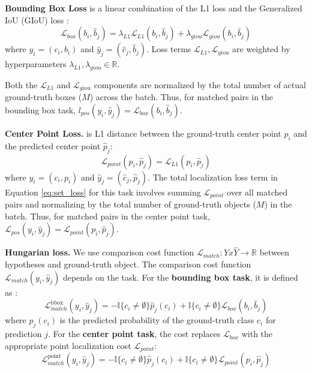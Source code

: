 \textbf{Bounding Box Loss} is a linear combination of the L1 loss and the Generalized IoU (GIoU) loss \cite{rezatofighiGeneralizedIntersectionUnion2019}:
\begin{equation}
    \mathcal{L}_{box}(b_i, \hat{b}_j) = \lambda_{L1} \mathcal{L}_{L1}(b_i, \hat{b}_j) + \lambda_{giou} \mathcal{L}_{giou}(b_i, \hat{b}_j)
    \label{eq:box_loss_revised}
\end{equation}
where $y_i = (c_i, b_i)$ and $\hat{y}_j = (\hat{c}_j, \hat{b}_j)$. Loss terms $ \mathcal{L}_{L1}, \mathcal{L}_{giou} $ are weighted by hyperparameters $ \lambda_{L1}, \lambda_{giou} \in \mathbb{R} $.

Both the $ \mathcal{L}_{L1} $ and $ \mathcal{L}_{giou} $ components are normalized by the total number of actual ground-truth boxes ($M$) across the batch. Thus, for matched pairs in the bounding box task, $l_{pos}(y_i, \hat{y}_j) = \mathcal{L}_{box}(b_i, \hat{b}_j)$.

\textbf{Center Point Loss.} is L1 distance between the ground-truth center point $p_i$ and the predicted center point $\hat{p}_j$:
\begin{equation} \label{eq:point_loss}
    \mathcal{L}_{point}(p_i, \hat{p}_j) = \mathcal{L}_{L1}(p_i, \hat{p}_j)
\end{equation}
where $y_i = (c_i, p_i)$ and $\hat{y}_j = (\hat{c}_j, \hat{p}_j)$. The total localization loss term in Equation \ref{eq:set_loss} for this task involves summing $\mathcal{L}_{point}$ over all matched pairs and normalizing by the total number of ground-truth objects ($M$) in the batch. Thus, for matched pairs in the center point task, $\mathcal{L}_{pos}(y_i, \hat{y}_j) = \mathcal{L}_{point}(p_i, \hat{p}_j)$.

\textbf{Hungarian loss.} We use comparison cost function $\mathcal{L}_{match}: Y x \hat{Y} \rightarrow \mathbb{R}$ between hypotheses and ground-truth object. The comparison cost function $\mathcal{L}_{match}(y_i, \hat{y}_j)$ depends on the task. For the \textbf{bounding box task}, it is defined as \cite{carionEndtoEndObjectDetection2020}:
\begin{equation} \label{eq:matching_cost_bbox}
\mathcal{L}_{match}^{\text{bbox}}(y_i, \hat{y}_j) = - \mathbb{I}\{c_i \neq \emptyset\} \hat{p}_{j}(c_i) + \mathbb{I}\{c_i \neq \emptyset\} \mathcal{L}_{box}(b_i, \hat{b}_{j})
\end{equation}
where $\hat{p}_j(c_i)$ is the predicted probability of the ground-truth class $c_i$ for prediction $j$. For the \textbf{center point task}, the cost replaces $\mathcal{L}_{box}$ with the appropriate point localization cost $\mathcal{L}_{point}$:
\begin{equation} \label{eq:matching_cost_point}
\mathcal{L}_{match}^{\text{point}}(y_i, \hat{y}_j) = - \mathbb{I}\{c_i \neq \emptyset\} \hat{p}_{j}(c_i) + \mathbb{I}\{c_i \neq \emptyset\} \mathcal{L}_{point}(p_i, \hat{p}_{j})
\end{equation}

